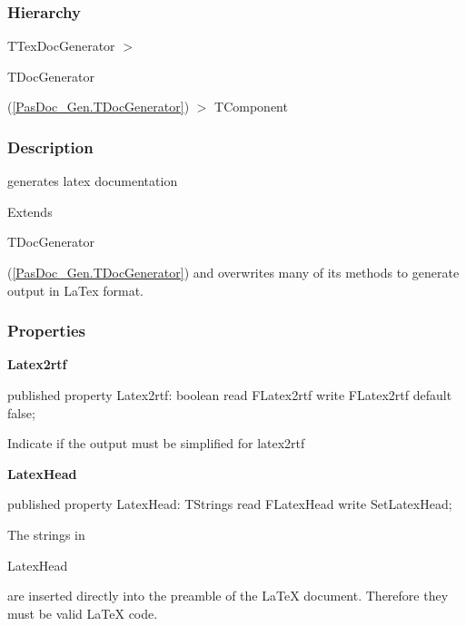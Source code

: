 \documentclass{report}
\newif\ifpdf
\begin{document}
\subsubsection*{\large{\textbf{Hierarchy}}\normalsize\hspace{1ex}\hfill}
TTexDocGenerator {$>$} \begin{ttfamily}TDocGenerator\end{ttfamily}(\ref{PasDoc_Gen.TDocGenerator}) {$>$} 
TComponent
\subsubsection*{\large{\textbf{Description}}\normalsize\hspace{1ex}\hfill}
generates latex documentation\hfill\vspace*{1ex}

 Extends \begin{ttfamily}TDocGenerator\end{ttfamily}(\ref{PasDoc_Gen.TDocGenerator}) and overwrites many of its methods to generate output in LaTex format.\subsubsection*{\large{\textbf{Properties}}\normalsize\hspace{1ex}\hfill}
\begin{list}{}{
\setlength{\itemindent}{0cm}
\setlength{\listparindent}{0cm}
\setlength{\leftmargin}{\evensidemargin}
\addtolength{\leftmargin}{\tmplength}
\settowidth{\labelsep}{X}
\addtolength{\leftmargin}{\labelsep}
\setlength{\labelwidth}{\tmplength}
}
\label{PasDoc_GenLatex.TTexDocGenerator-Latex2rtf}
\item[\textbf{Latex2rtf}\hfill]
\ifpdf
\begin{flushleft}
\fi
\begin{ttfamily}
published property Latex2rtf: boolean read FLatex2rtf write FLatex2rtf default false;\end{ttfamily}

\ifpdf
\end{flushleft}
\fi


\par Indicate if the output must be simplified for latex2rtf\label{PasDoc_GenLatex.TTexDocGenerator-LatexHead}
\item[\textbf{LatexHead}\hfill]
\ifpdf
\begin{flushleft}
\fi
\begin{ttfamily}
published property LatexHead: TStrings read FLatexHead write SetLatexHead;\end{ttfamily}

\ifpdf
\end{flushleft}
\fi


\par The strings in \begin{ttfamily}LatexHead\end{ttfamily} are inserted directly into the preamble of the LaTeX document. Therefore they must be valid LaTeX code.\end{list}
\end{document}
